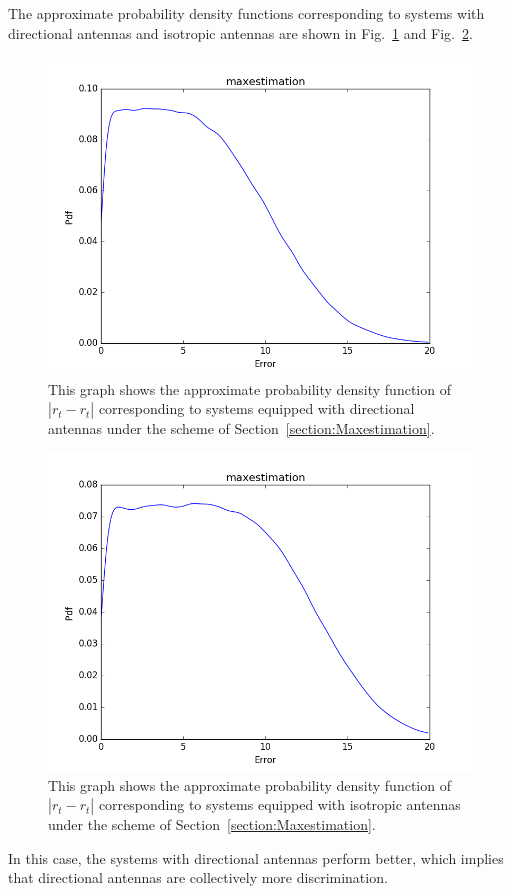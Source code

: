 	The approximate probability density functions corresponding to systems with directional antennas and isotropic antennas are shown in Fig.~\ref{figure: maxdirex} and Fig.~\ref{figure: maxomniex}.
	\begin{figure}[]
		\centering
		\includegraphics[scale=0.5]{Figures/maxdirex.png}
		\caption{This graph shows the approximate probability density function of $|r_{t}-\hat{r_{t}}|$ corresponding to systems equipped with directional antennas under the scheme of Section~\ref{section:Maxestimation}. }
		\label{figure: maxdirex}
	\end{figure}
	\begin{figure}[]
		\centering
		\includegraphics[scale=0.5]{Figures/maxomniex.png}
		\caption{This graph shows the approximate probability density function of $|r_{t}-\hat{r_{t}}|$ corresponding to systems equipped with isotropic antennas under the scheme of Section~\ref{section:Maxestimation}. }
		\label{figure: maxomniex}
	\end{figure}
In this case, the systems with directional antennas perform better, which implies that directional antennas are collectively more discrimination.

